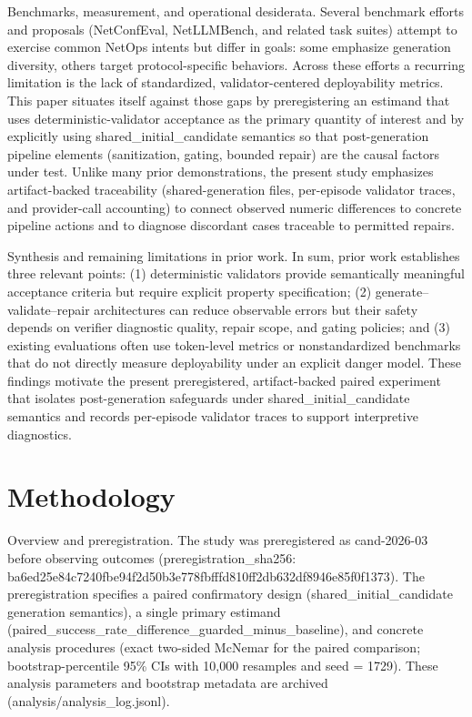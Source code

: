 \documentclass[conference]{IEEEtran}
\begin{document}
Benchmarks, measurement, and operational desiderata. Several benchmark efforts and proposals (NetConfEval, NetLLMBench, and related task suites) attempt to exercise common NetOps intents but differ in goals: some emphasize generation diversity, others target protocol-specific behaviors. Across these efforts a recurring limitation is the lack of standardized, validator-centered deployability metrics. This paper situates itself against those gaps by preregistering an estimand that uses deterministic-validator acceptance as the primary quantity of interest and by explicitly using shared\_initial\_candidate semantics so that post-generation pipeline elements (sanitization, gating, bounded repair) are the causal factors under test. Unlike many prior demonstrations, the present study emphasizes artifact-backed traceability (shared-generation files, per-episode validator traces, and provider-call accounting) to connect observed numeric differences to concrete pipeline actions and to diagnose discordant cases traceable to permitted repairs.

Synthesis and remaining limitations in prior work. In sum, prior work establishes three relevant points: (1) deterministic validators provide semantically meaningful acceptance criteria but require explicit property specification; (2) generate--validate--repair architectures can reduce observable errors but their safety depends on verifier diagnostic quality, repair scope, and gating policies; and (3) existing evaluations often use token-level metrics or nonstandardized benchmarks that do not directly measure deployability under an explicit danger model. These findings motivate the present preregistered, artifact-backed paired experiment that isolates post-generation safeguards under shared\_initial\_candidate semantics and records per-episode validator traces to support interpretive diagnostics.

\section{Methodology}
Overview and preregistration. The study was preregistered as cand-2026-03 before observing outcomes (preregistration\_sha256: ba6ed25e\allowbreak{}84c7240f\allowbreak{}be94f2d5\allowbreak{}0b3e778f\allowbreak{}bfffd810\allowbreak{}ff2db632\allowbreak{}df8946e8\allowbreak{}5f0f1373). The preregistration specifies a paired confirmatory design (shared\_initial\_candidate generation semantics), a single primary estimand (paired\_success\_rate\_difference\_guarded\_minus\_baseline), and concrete analysis procedures (exact two-sided McNemar for the paired comparison; bootstrap-percentile 95\% CIs with 10,000 resamples and seed = 1729). These analysis parameters and bootstrap metadata are archived (analysis/analysis\_log.jsonl).
\end{document}
